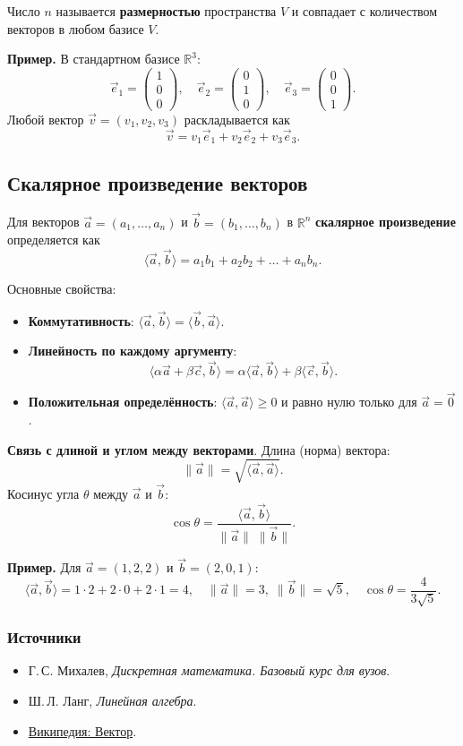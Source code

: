 Число $n$ называется \textbf{размерностью} пространства $V$ и совпадает с количеством векторов в любом базисе $V$.

\textbf{Пример.} В стандартном базисе $\mathbb{R}^3$:
\[
\vec{e}_1 = \begin{pmatrix}1\\0\\0\end{pmatrix},\quad
\vec{e}_2 = \begin{pmatrix}0\\1\\0\end{pmatrix},\quad
\vec{e}_3 = \begin{pmatrix}0\\0\\1\end{pmatrix}.
\]
Любой вектор $\vec{v}=(v_1,v_2,v_3)$ раскладывается как
\[
\vec{v} = v_1\vec{e}_1 + v_2\vec{e}_2 + v_3\vec{e}_3.
\]

\subsection{Скалярное произведение векторов}

Для векторов $\vec{a}=(a_1,\dots,a_n)$ и $\vec{b}=(b_1,\dots,b_n)$ в $\mathbb{R}^n$ \textbf{скалярное произведение} определяется как
\[
\langle \vec{a}, \vec{b} \rangle = a_1 b_1 + a_2 b_2 + \dots + a_n b_n.
\]

Основные свойства:
\begin{itemize}[leftmargin=*]
  \item \textbf{Коммутативность}: $\langle \vec{a}, \vec{b} \rangle = \langle \vec{b}, \vec{a} \rangle$.
  \item \textbf{Линейность по каждому аргументу}: 
    \[
      \langle \alpha \vec{a} + \beta \vec{c}, \vec{b} \rangle = \alpha \langle \vec{a}, \vec{b} \rangle + \beta \langle \vec{c}, \vec{b} \rangle.
    \]
  \item \textbf{Положительная определённость}: $\langle \vec{a}, \vec{a} \rangle \ge 0$ и равно нулю только для $\vec{a}=\vec{0}$.
\end{itemize}

\textbf{Связь с длиной и углом между векторами}. Длина (норма) вектора:
\[
\|\vec{a}\| = \sqrt{\langle \vec{a}, \vec{a} \rangle}.
\]
Косинус угла $\theta$ между $\vec{a}$ и $\vec{b}$:
\[
\cos\theta = \frac{\langle \vec{a}, \vec{b} \rangle}{\|\vec{a}\|\;\|\vec{b}\|}.
\]

\textbf{Пример.} Для $\vec{a}=(1,2,2)$ и $\vec{b}=(2,0,1)$:
\[
\langle \vec{a}, \vec{b} \rangle = 1\cdot2 + 2\cdot0 + 2\cdot1 = 4,
\quad
\|\vec{a}\| = 3,\;
\|\vec{b}\| = \sqrt{5},
\quad
\cos\theta = \frac{4}{3\sqrt{5}}.
\]

\subsubsection{Источники}

\begin{itemize}
  \item Г.\,С. Михалев, \textit{Дискретная математика. Базовый курс для вузов}.
  \item Ш.\,Л. Ланг, \textit{Линейная алгебра}.
  \item \href{https://ru.wikipedia.org/wiki/Вектор}{Википедия: Вектор}.
\end{itemize}

